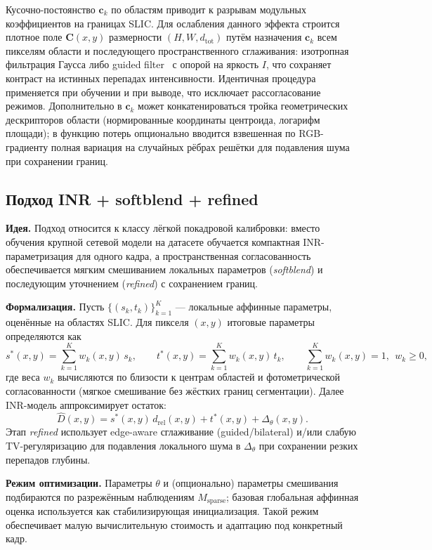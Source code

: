 \documentclass[12pt]{article}
\begin{document}
Кусочно-постоянство $\mathbf{c}_k$ по областям приводит к разрывам модульных коэффициентов на границах SLIC. Для ослабления данного эффекта строится плотное поле $\mathbf{C}(x,y)$ размерности $(H,W,d_{\mathrm{tot}})$ путём назначения $\mathbf{c}_k$ всем пикселям области и последующего пространственного сглаживания: изотропная фильтрация Гаусса либо guided filter~\cite{he2010guided} с опорой на яркость $I$, что сохраняет контраст на истинных перепадах интенсивности. Идентичная процедура применяется при обучении и при выводе, что исключает рассогласование режимов. Дополнительно в $\mathbf{c}_k$ может конкатенироваться тройка геометрических дескрипторов области (нормированные координаты центроида, логарифм площади); в функцию потерь опционально вводится взвешенная по RGB-градиенту полная вариация на случайных рёбрах решётки для подавления шума при сохранении границ.

\subsection{Подход INR + softblend + refined}

\textbf{Идея.} Подход относится к классу лёгкой покадровой калибровки: вместо обучения крупной сетевой модели на датасете обучается компактная INR-параметризация для одного кадра, а пространственная согласованность обеспечивается мягким смешиванием локальных параметров (\textit{softblend}) и последующим уточнением (\textit{refined}) с сохранением границ.

\textbf{Формализация.} Пусть $\{(s_k,t_k)\}_{k=1}^K$ --- локальные аффинные параметры, оценённые на областях SLIC. Для пикселя $(x,y)$ итоговые параметры определяются как
\[
  s^\ast(x,y)=\sum_{k=1}^{K} w_k(x,y)\,s_k,\qquad
  t^\ast(x,y)=\sum_{k=1}^{K} w_k(x,y)\,t_k,\qquad
  \sum_{k=1}^{K} w_k(x,y)=1,\ \ w_k\ge 0,
\]
где веса $w_k$ вычисляются по близости к центрам областей и фотометрической согласованности (мягкое смешивание без жёстких границ сегментации). Далее INR-модель аппроксимирует остаток:
\[
  \hat D(x,y)=s^\ast(x,y)\,d_{\mathrm{rel}}(x,y)+t^\ast(x,y)+\Delta_\theta(x,y).
\]
Этап \textit{refined} использует edge-aware сглаживание (guided/bilateral) и/или слабую TV-регуляризацию для подавления локального шума в $\Delta_\theta$ при сохранении резких перепадов глубины.

\textbf{Режим оптимизации.} Параметры $\theta$ и (опционально) параметры смешивания подбираются по разрежённым наблюдениям $M_{\mathrm{sparse}}$; базовая глобальная аффинная оценка используется как стабилизирующая инициализация. Такой режим обеспечивает малую вычислительную стоимость и адаптацию под конкретный кадр.
\end{document}
